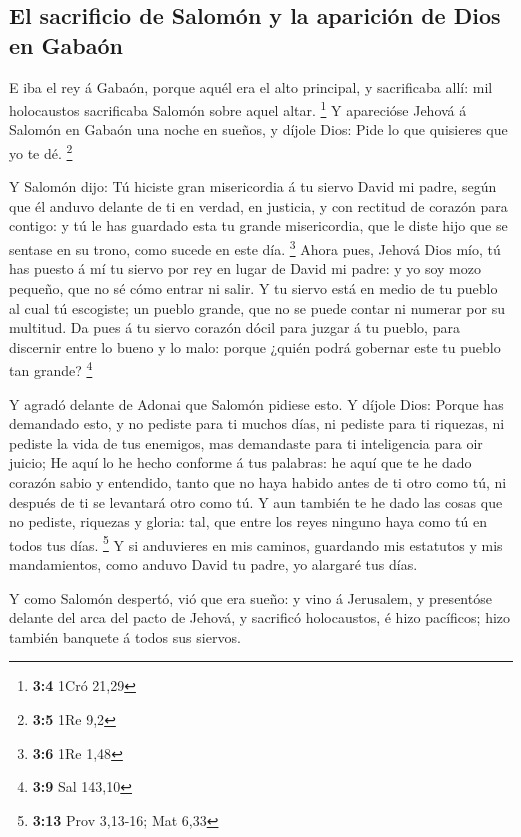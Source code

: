 \hypertarget{el-sacrificio-de-salomuxf3n-y-la-apariciuxf3n-de-dios-en-gabauxf3n}{%
\subsection{El sacrificio de Salomón y la aparición de Dios en
Gabaón}\label{el-sacrificio-de-salomuxf3n-y-la-apariciuxf3n-de-dios-en-gabauxf3n}}

 E iba el rey á Gabaón, porque aquél era el alto principal,
y sacrificaba allí: mil holocaustos sacrificaba Salomón sobre aquel
altar. \footnote{\textbf{3:4} 1Cró 21,29}  Y aparecióse
Jehová á Salomón en Gabaón una noche en sueños, y díjole Dios: Pide lo
que quisieres que yo te dé. \footnote{\textbf{3:5} 1Re 9,2}

 Y Salomón dijo: Tú hiciste gran misericordia á tu siervo
David mi padre, según que él anduvo delante de ti en verdad, en
justicia, y con rectitud de corazón para contigo: y tú le has guardado
esta tu grande misericordia, que le diste hijo que se sentase en su
trono, como sucede en este día. \footnote{\textbf{3:6} 1Re 1,48}
 Ahora pues, Jehová Dios mío, tú has puesto á mí tu siervo
por rey en lugar de David mi padre: y yo soy mozo pequeño, que no sé
cómo entrar ni salir.  Y tu siervo está en medio de tu
pueblo al cual tú escogiste; un pueblo grande, que no se puede contar ni
numerar por su multitud.  Da pues á tu siervo corazón dócil
para juzgar á tu pueblo, para discernir entre lo bueno y lo malo: porque
¿quién podrá gobernar este tu pueblo tan grande? \footnote{\textbf{3:9}
  Sal 143,10}

 Y agradó delante de Adonai que Salomón pidiese esto.
 Y díjole Dios: Porque has demandado esto, y no pediste
para ti muchos días, ni pediste para ti riquezas, ni pediste la vida de
tus enemigos, mas demandaste para ti inteligencia para oir juicio;
 He aquí lo he hecho conforme á tus palabras: he aquí que
te he dado corazón sabio y entendido, tanto que no haya habido antes de
ti otro como tú, ni después de ti se levantará otro como tú.
 Y aun también te he dado las cosas que no pediste,
riquezas y gloria: tal, que entre los reyes ninguno haya como tú en
todos tus días. \footnote{\textbf{3:13} Prov 3,13-16; Mat 6,33}
 Y si anduvieres en mis caminos, guardando mis estatutos y
mis mandamientos, como anduvo David tu padre, yo alargaré tus días.

 Y como Salomón despertó, vió que era sueño: y vino á
Jerusalem, y presentóse delante del arca del pacto de Jehová, y
sacrificó holocaustos, é hizo pacíficos; hizo también banquete á todos
sus siervos.

